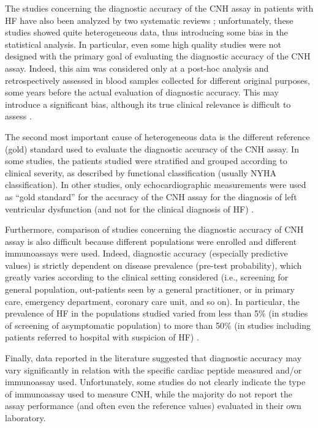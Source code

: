 \documentclass[14pt,a4paper,onecolumn]{extarticle}
\begin{document}
The studies concerning the diagnostic accuracy of the CNH assay in patients with HF have also been analyzed by two systematic reviews \citep{bib35} \citep{bib372}; unfortunately, these studies showed quite heterogeneous data, thus introducing some bias in the statistical analysis. In particular, even some high quality studies were not designed with the primary goal of evaluating the diagnostic accuracy of the CNH assay. Indeed, this aim was considered only at a post-hoc analysis and retrospectively assessed in blood samples collected for different original purposes, some years before the actual evaluation of diagnostic accuracy. This may introduce a significant bias, although its true clinical relevance is difficult to assess \citep{bib35}.

The second most important cause of heterogeneous data is the different reference (gold) standard used to evaluate the diagnostic accuracy of the CNH assay. In some studies, the patients studied were stratified and grouped according to clinical severity, as described by functional classification (usually NYHA classification). In other studies, only echocardiographic measurements were used as “gold standard” for the accuracy of the CNH assay for the diagnosis of left ventricular dysfunction (and not for the clinical diagnosis of HF) \citep{bib35} \citep{bib372}.

Furthermore, comparison of studies concerning the diagnostic accuracy of CNH assay is also difficult because different populations were enrolled and different immunoassays were used. Indeed, diagnostic accuracy (especially predictive values) is strictly dependent on disease prevalence (pre-test probability), which greatly varies according to the clinical setting considered (i.e., screening for general population, out-patients seen by a general practitioner, or in primary care, emergency department, coronary care unit, and so on). In particular, the prevalence of HF in the populations studied varied from less than 5\% (in studies of screening of asymptomatic population) to more than 50\% (in studies including patients referred to hospital with suspicion of HF) \citep{bib35}.

Finally,  data reported in the literature suggested that diagnostic accuracy may vary significantly in relation with the specific cardiac peptide measured and/or immunoassay used.
Unfortunately, some studies do not clearly indicate the type of immunoassay used to measure CNH, while the majority do not report the assay performance (and often even the reference values) evaluated in their own laboratory.\citep{bib35}
\end{document}

